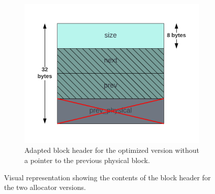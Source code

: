 \begin{figure}[H]
\begin{subfigure}[b]{0.49\textwidth}
        \includegraphics[width=\textwidth]{figures/blockheader_small.png}
        \caption{Adapted block header for the optimized version without a pointer to the previous physical block.}
        \label{fig:blockheader_small}
    \end{subfigure}
    \caption{Visual representation showing the contents of the block header for the two allocator versions.}
    \label{fig:blockheader_adaptations}
\end{figure}

